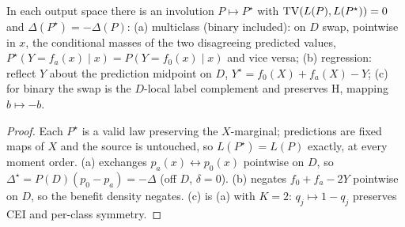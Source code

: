 \begin{lemma}\label{lem:swap}
In each output space there is an involution $P\mapsto P^\star$ with
$\mathrm{TV}(L(P),L(P^\star))=0$ and $\Delta(P^\star)=-\Delta(P)$:
\textnormal{(a)} multiclass (binary included): on $D$ swap, pointwise in $x$, the
conditional masses of the two disagreeing predicted values,
$P^\star(Y{=}f_a(x)\mid x)=P(Y{=}f_0(x)\mid x)$ and vice versa;
\textnormal{(b)} regression: reflect $Y$ about the prediction midpoint on $D$,
$Y^\star=f_0(X)+f_a(X)-Y$;
\textnormal{(c)} for binary the swap is the $D$-local label complement and preserves H,
mapping $b\mapsto-b$.
\end{lemma}
\begin{proof}
Each $P^\star$ is a valid law preserving the $X$-marginal; predictions are fixed maps of
$X$ and the source is untouched, so $L(P^\star)=L(P)$ exactly, at every moment order.
(a) exchanges $p_a(x)\leftrightarrow p_0(x)$ pointwise on $D$, so
$\Delta^\star=P(D)(p_0-p_a)=-\Delta$ (off $D$, $\delta=0$). (b) negates
$f_0{+}f_a{-}2Y$ pointwise on $D$, so the benefit density negates. (c) is (a) with
$K{=}2$: $q_j\mapsto1-q_j$ preserves CEI and per-class symmetry.
\end{proof}

